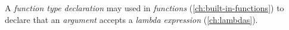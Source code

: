 A \emph{function type declaration}
may used in \emph{functions} (\ref{ch:built-in-functions})
to declare that an \emph{argument} accepts a \emph{lambda expression} (\ref{ch:lambdas}).
